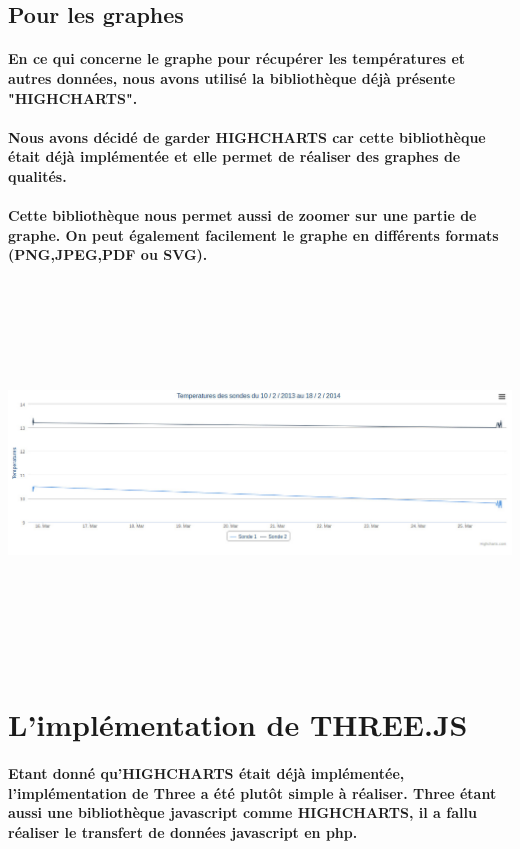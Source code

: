 \documentclass[12pt , a4paper,titlepage]{report}
\begin{document}
 \subsection{Pour les graphes}

 \paragraph{   En ce qui concerne le graphe pour récupérer les températures et autres données, nous avons utilisé la bibliothèque déjà 
 présente "HIGHCHARTS". }
 \paragraph{   Nous avons décidé de garder HIGHCHARTS car cette bibliothèque était déjà implémentée et elle permet de réaliser des
 graphes de qualités.}
 \paragraph{  Cette bibliothèque nous permet aussi de zoomer sur une partie de graphe. On peut également facilement le graphe en
 différents formats (PNG,JPEG,PDF ou SVG).} 
 \begin{center}
    \includegraphics[width=15cm, height=10cm]{temperature.jpg}
 \end{center}
  \newpage
 \section{L'implémentation de THREE.JS}
 \paragraph{   Etant donné qu'HIGHCHARTS était déjà implémentée, l’implémentation de Three a été plutôt simple à réaliser. Three étant 
 aussi une bibliothèque javascript comme HIGHCHARTS, il a fallu réaliser le transfert de données javascript en php.}
\end{document}
